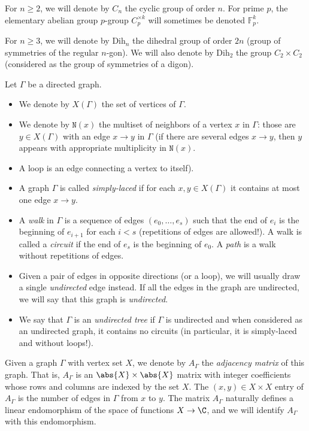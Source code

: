 \begin{nota}
 {For $n\geq 2$, we will denote by $C_n$ the cyclic group of order $n$. For prime $p$, the elementary abelian group $p$-group $C_p^{\times k}$ will sometimes be denoted $\mathbb{F}_p^k$.}
\end{nota}

\begin{nota}
 {For $n\geq 3$,} we will denote by $\mathrm{Dih}_n$ the dihedral group of order $2n$ (group of symmetries of the regular $n$-gon). {We will also denote by $\mathrm{Dih}_2$ the group $C_2 \times C_2$ (considered as the group of symmetries of a digon).}
\end{nota}

\begin{nota}
 Let $\Gamma$ be a directed graph.  
 \begin{itemize}
 \item We denote by $X(\Gamma)$ the set of vertices of $\Gamma$. 
 \item We denote by $\mathtt{N}(x)$ the multiset of neighbors of a vertex $x$ in $\Gamma$: those are $y\in X(\Gamma)$ with an edge $x\to y$ in $\Gamma$ (if there are several edges $x \to y$, then $y$ appears with appropriate multiplicity in $\mathtt{N}(x)$.
 \item A loop is an edge connecting a vertex to itself). 
 \item A graph $\Gamma$ is called {\it simply-laced} if for each $x, y \in X(\Gamma)$ it contains at most one edge $x \to y$.
 \item A {\it walk} in $\Gamma$ is a sequence of edges $(e_0, \ldots, e_s)$ such that the end of $e_i$ is the beginning of $e_{i+1}$ for each $i<s$ (repetitions of edges are allowed!). A walk is called a {\it circuit} if the end of $e_s$ is the beginning of $e_{0}$. A {\it path} is a walk without repetitions of edges.
 \item Given a pair of edges in opposite directions (or a loop), we will usually draw a single {\it undirected} edge instead. If all the edges in the graph are undirected, we will say that this graph is {\it undirected}. 
 \item We say that $\Gamma$ is an {\it undirected tree} if $\Gamma$ is undirected and when considered as an undirected graph, it contains no circuits (in particular, it is simply-laced and without loops!).
 \end{itemize}
 
\end{nota}
\begin{nota}
 Given a graph $\Gamma$ with vertex set $X$, we denote by $A_{\Gamma}$ the {\it adjacency matrix} of this graph. That is, $A_{\Gamma}$ is an $\abs{X} \times \abs{X}$ matrix with integer coefficients whose rows and columns are indexed by the set $X$. The $(x,y) \in X \times X$ entry of $A_{\Gamma}$ is the number of edges in $\Gamma$ from $x$ to $y$. The matrix $A_{\Gamma}$ naturally defines a linear endomorphism of the space of functions $X \to \C$, and we will identify $A_{\Gamma}$ with this endomorphism. 
\end{nota}

